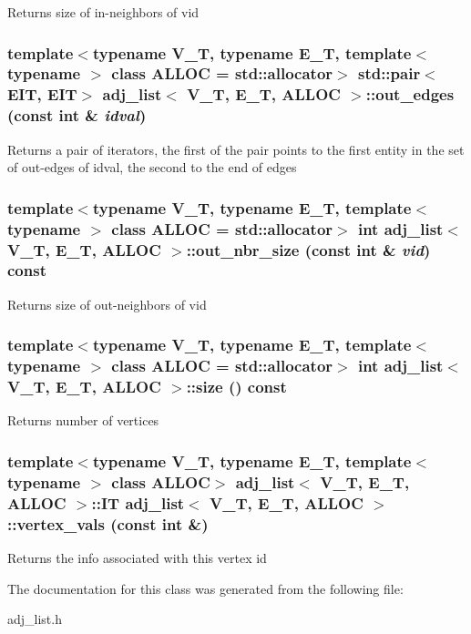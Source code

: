 Returns size of in-neighbors of vid 
\subsubsection{\setlength{\rightskip}{0pt plus 5cm}template$<$typename V\_\-T, typename E\_\-T, template$<$ typename $>$ class ALLOC = std::allocator$>$ std::pair$<$EIT, EIT$>$ \bf{adj\_\-list}$<$ V\_\-T, E\_\-T, ALLOC $>$::out\_\-edges (const int \& {\em idval})\hspace{0.3cm}{\tt  [inline]}}\label{classadj__list_528f1fe0f4e10a6627285be96bfbb2d1}


Returns a pair of iterators, the first of the pair points to the first entity in the set of out-edges of idval, the second to the end of edges 
\subsubsection{\setlength{\rightskip}{0pt plus 5cm}template$<$typename V\_\-T, typename E\_\-T, template$<$ typename $>$ class ALLOC = std::allocator$>$ int \bf{adj\_\-list}$<$ V\_\-T, E\_\-T, ALLOC $>$::out\_\-nbr\_\-size (const int \& {\em vid}) const\hspace{0.3cm}{\tt  [inline]}}\label{classadj__list_f2fc5a797c830ed006ba7fba24ceaf11}


Returns size of out-neighbors of vid 
\subsubsection{\setlength{\rightskip}{0pt plus 5cm}template$<$typename V\_\-T, typename E\_\-T, template$<$ typename $>$ class ALLOC = std::allocator$>$ int \bf{adj\_\-list}$<$ V\_\-T, E\_\-T, ALLOC $>$::size () const\hspace{0.3cm}{\tt  [inline]}}\label{classadj__list_82beab1a8b5d2aaf00b5ee265ab7f8b9}


Returns number of vertices 
\subsubsection{\setlength{\rightskip}{0pt plus 5cm}template$<$typename V\_\-T, typename E\_\-T, template$<$ typename $>$ class ALLOC$>$ \bf{adj\_\-list}$<$ V\_\-T, E\_\-T, ALLOC $>$::IT \bf{adj\_\-list}$<$ V\_\-T, E\_\-T, ALLOC $>$::vertex\_\-vals (const int \&)}\label{classadj__list_91205b35a8ce0ca20ce43aab5b39d87d}


Returns the info associated with this vertex id 

The documentation for this class was generated from the following file:\begin{CompactItemize}
\item 
adj\_\-list.h\end{CompactItemize}

